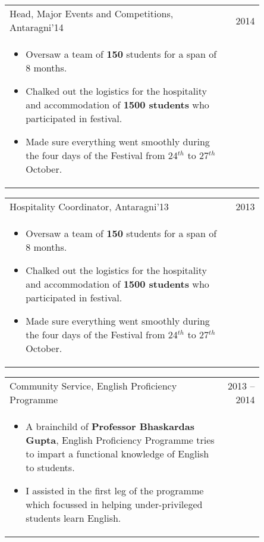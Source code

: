 \documentclass[a4paper,10pt]{article} %
\newcommand{\projectlistdated}[3]{
    \begin{tabular}{p{0.85\linewidth}r}
        \textcolor{NavyBlue}{#2} & \multicolumn{1}{m{3cm}}{\raggedleft \textsc{#1}}\\
        \vspace{-0.3cm}
        \footnotesize{#3}
    \end{tabular}
    \vspace{-0.4cm}
}
\begin{document}
\projectlistdated {2014}
                  {Head, Major Events and Competitions, Antaragni'14}
                  {
                       \begin{itemize}[leftmargin=0.5cm]
                           \item Oversaw a team of \textbf{150} students for a span of 8 months.
                           \item Chalked out the logistics for the hospitality and accommodation of \textbf{1500 students} who
                               participated in festival.
                           \item Made sure everything went smoothly during the four days of the Festival from 24$^{th}$
                               to 27$^{th}$ October.
                       \end{itemize}
                  }

\projectlistdated {2013}
                  {Hospitality Coordinator, Antaragni'13}
                  {
                       \begin{itemize}[leftmargin=0.5cm]
                           \item Oversaw a team of \textbf{150} students for a span of 8 months.
                           \item Chalked out the logistics for the hospitality and accommodation of \textbf{1500 students} who
                               participated in festival.
                           \item Made sure everything went smoothly during the four days of the Festival from 24$^{th}$
                               to 27$^{th}$ October.
                       \end{itemize}
                  }

\projectlistdated {2013 -- 2014}
                  {Community Service, English Proficiency Programme}
                  {
                       \begin{itemize}[leftmargin=0.5cm]
                           \item A brainchild of \textbf{Professor Bhaskardas Gupta}, English Proficiency
                               Programme tries to impart a functional knowledge of English to students.
                           \item I assisted in the first leg of the programme which focussed in helping
                               under-privileged students learn English.
                       \end{itemize}
                  }
\end{document}
